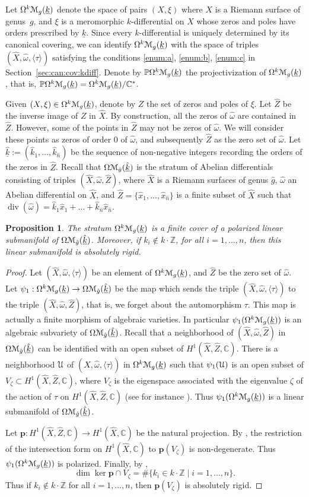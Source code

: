 \documentclass[11pt]{article}
\numberwithin{equation}{section}
\let\mathcal\EuScript
\DeclareMathOperator{\Div}{div}
\theoremstyle{plain}
\newtheorem{Proposition}[Theorem]{Proposition}
\theoremstyle{definition}
\def\C{\mathbb{C}}
\newcommand\Z{\mathbb{Z}}
\newcommand{\Pb}{\mathbb{P}}
\newcommand{\pp}{\boldsymbol{p}}
\newcommand{\Mcal}{\mathcal{M}}
\newcommand{\Ucal}{\mathcal{U}}
\newcommand{\hg}{\hat{g}}
\newcommand{\hn}{\hat{n}}
\newcommand{\hx}{\hat{x}}
\newcommand{\hX}{\hat{X}}
\newcommand{\hZ}{\hat{Z}}
\newcommand{\homg}{\hat{\omega}}
\newcommand{\hk}{\hat{k}}
\let\ul\underline
\newcommand{\Skdiff}{\Omega^k\mathcal{M}_{g}(\ul{k})}
\newcommand{\Sabel}{\Omega\Mcal_{\hat{g}}(\ul{\hat{k}})}
\newcommand{\pSkdiff}{\Pb\Omega^k\mathcal{M}_{g}(\ul{k})}
\begin{document}
Let $\Skdiff$ denote the space of pairs $(X,\xi)$ where $X$ is a Riemann surface of genus~$g$, and $\xi$ is a meromorphic $k$-differential on $X$ whose zeros and poles have orders prescribed by $\ul{k}$.
Since every $k$-differential is uniquely determined by its canonical covering, we can identify $\Skdiff$ with the space of triples $(\hX,\homg,\langle\tau\rangle)$ satisfying the conditions \eqref{enum:a}, \eqref{enum:b}, \eqref{enum:c} in Section~\ref{sec:can:cov:kdiff}.
Denote by $\pSkdiff$ the projectivization of $\Skdiff$, that is, $\pSkdiff=\Skdiff/\C^*$.

Given $(X,\xi)\in \Skdiff$, denote by $Z$ the set of zeros and poles of $\xi$. Let $\hZ$ be the inverse image of $Z$ in $\hX$. By construction, all the zeros of $\homg$ are contained in $\hZ$.
However, some of the points in $\hZ$ may not be zeros of $\homg$. We will consider these points as zeros of order $0$ of $\homg$, and subsequently $\hZ$ as the zero set of $\homg$.
Let $\ul{\hk}:=(\hk_1,\dots,\hk_{\hn})$ be the sequence of non-negative integers recording the orders of the zeros in $\hZ$.
Recall that $\Sabel$ is the stratum of Abelian differentials consisting of triples $(\hX,\homg,\hZ)$, where $\hX$ is a Riemann surfaces of genus $\hg$, $\homg$ an Abelian differential on $\hX$, and $\hZ=\{\hx_1,\dots,\hx_{\hn}\}$ is a finite subset of $\hX$ such that $\Div(\homg)=\hk_1\hx_1+\dots+\hk_{\hn}\hx_{\hn}$.

\begin{Proposition}\label{prop:kdiff:ln:man}
The stratum $\Skdiff$ is a finite cover of a polarized linear submanifold of $\Sabel$. Moreover, if $k_i\not\in k\cdot\Z$, for all $i=1,\dots,n$, then this linear submanifold is absolutely rigid.
\end{Proposition}
\begin{proof}
Let $(\hX,\homg,\langle\tau\rangle)$ be an element of $\Skdiff$, and $\hZ$ be the zero set of $\homg$. Let $\psi_1: \Skdiff \to \Sabel$ be the map which sends the triple $(\hX,\homg,\langle \tau \rangle)$ to the triple $(\hX,\homg,\hZ)$, that is, we forget about the automorphism $\tau$. This map is actually a finite morphism of algebraic varieties. In particular $\psi_1(\Skdiff)$ is an algebraic subvariety of $\Sabel$.
Recall that a neighborhood of $(\hX,\homg,\hZ)$ in $\Sabel$ can be identified with an open subset of $H^1(\hX,\hZ,\C)$.
There is a neighborhood $\Ucal$ of $(\hX,\homg,\langle\tau\rangle)$ in $\Skdiff$ such that $\psi_1(\Ucal)$ is an open subset of $V_\zeta \subset H^1(\hX,\hZ,\C)$, where $V_\zeta$ is the eigenspace associated with the eigenvalue $\zeta$ of the action of $\tau$ on $H^1(\hX,\hZ,\C)$ (see for instance \cite{BCGGM:kdiff, Ngu19}). Thus $\psi_1(\Skdiff)$ is a linear submanifold of $\Sabel$.

Let $\pp: H^1(\hX,\hZ,\C) \to H^1(\hX,\C)$ be the natural projection. By \cite[Prop.\,5.1]{Ngu19}, the restriction of the intersection form on $H^1(\hX,\C)$ to $\pp(V_\zeta)$ is non-degenerate. Thus $\psi_1(\Skdiff)$ is polarized. Finally, by \cite[Prop.\,4.1]{Ngu19},
\[
\dim \ker\pp\cap V_\zeta = \#\{k_i\in k\cdot\Z\mid i=1,\dots,n\}.
\]
Thus if $k_i\not\in k\cdot\Z$ for all $i=1,\dots,n$, then $\pp(V_\zeta)$ is absolutely rigid.
\end{proof}
\end{document}
